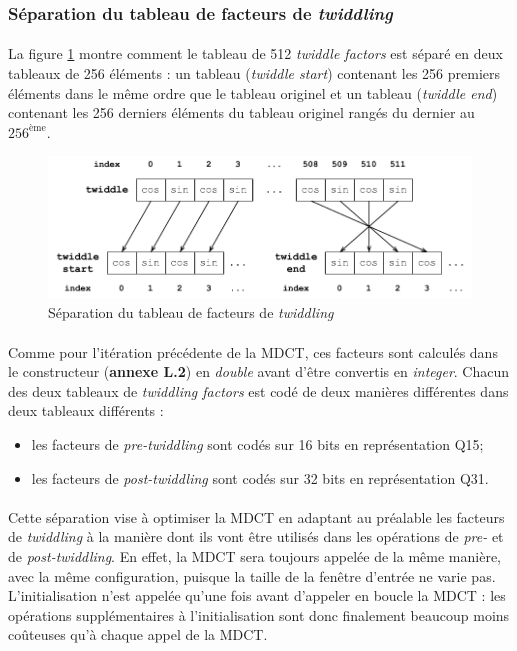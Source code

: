 \documentclass{article}
\begin{document}
    \subsubsection{Séparation du tableau de facteurs de \emph{twiddling}}
    \paragraph{}
    La figure \ref{fig:split_twiddles} montre comment le tableau de 512 \emph{twiddle factors} est séparé en deux tableaux de 256 éléments : un tableau (\emph{twiddle start}) contenant les 256 premiers éléments dans le même ordre que le tableau originel et un tableau (\emph{twiddle end}) contenant les 256 derniers éléments du tableau originel rangés du dernier au $256^{\text{ème}}$.

    \begin{figure}[H]
        \centering
        \includegraphics[width=.8\linewidth]{./images/split_twiddles.pdf}
        \caption{Séparation du tableau de facteurs de \emph{twiddling}}
        \label{fig:split_twiddles}
    \end{figure}

    \paragraph{}
    Comme pour l'itération précédente de la MDCT, ces facteurs sont calculés dans le constructeur (\textbf{annexe L.2}) en \emph{double} avant d'être convertis en \emph{integer}. Chacun des deux tableaux de \emph{twiddling factors} est codé de deux manières différentes dans deux tableaux différents :
    \begin{itemize}
        \item les facteurs de \emph{pre-twiddling} sont codés sur 16 bits en représentation Q15;
        \item les facteurs de \emph{post-twiddling} sont codés sur 32 bits en représentation Q31.
    \end{itemize}

    \paragraph{}
    Cette séparation vise à optimiser la MDCT en adaptant au préalable les facteurs de \emph{twiddling} à la manière dont ils vont être utilisés dans les opérations de \emph{pre-} et de \emph{post-twiddling}. En effet, la MDCT sera toujours appelée de la même manière, avec la même configuration, puisque la taille de la fenêtre d'entrée ne varie pas. L'initialisation n'est appelée qu'une fois avant d'appeler en boucle la MDCT : les opérations supplémentaires à l'initialisation sont donc finalement beaucoup moins coûteuses qu'à chaque appel de la MDCT.
\end{document}
